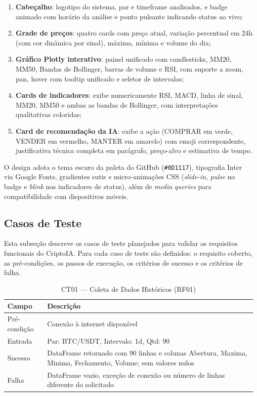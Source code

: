 \documentclass[conference]{IEEEtran}
\begin{document}
\begin{enumerate}
  \item \textbf{Cabeçalho}: logotipo do sistema, par e timeframe analisados, e badge animado com horário da análise e ponto pulsante indicando status ao vivo;
  \item \textbf{Grade de preços}: quatro cards com preço atual, variação percentual em 24h (com cor dinâmica por sinal), máxima, mínima e volume do dia;
  \item \textbf{Gráfico Plotly interativo}: painel unificado com candlesticks, MM20, MM50, Bandas de Bollinger, barras de volume e RSI, com suporte a zoom, pan, hover com tooltip unificado e seletor de intervalos;
  \item \textbf{Cards de indicadores}: exibe numericamente RSI, MACD, linha de sinal, MM20, MM50 e ambas as bandas de Bollinger, com interpretações qualitativas coloridas;
  \item \textbf{Card de recomendação da IA}: exibe a ação (COMPRAR em verde, VENDER em vermelho, MANTER em amarelo) com emoji correspondente, justificativa técnica completa em parágrafo, preço-alvo e estimativa de tempo.
\end{enumerate}

O design adota o tema escuro da paleta do GitHub (\texttt{\#0D1117}), tipografia Inter via Google Fonts, gradientes sutis e micro-animações CSS (\textit{slide-in}, \textit{pulse} no badge e \textit{blink} nos indicadores de status), além de \textit{media queries} para compatibilidade com dispositivos móveis.

\subsection{Casos de Teste}
\label{sec:testes}

Esta subseção descreve os casos de teste planejados para validar os requisitos funcionais do CriptoIA. Para cada caso de teste são definidos: o requisito coberto, as pré-condições, os passos de execução, os critérios de sucesso e os critérios de falha.

\begin{table}[H]
  \centering
  \caption{CT01 — Coleta de Dados Históricos (RF01)}
  \label{tab:ct01}
  \begin{tabular}{p{2.5cm}p{5cm}}
    \toprule
    \textbf{Campo} & \textbf{Descrição} \\
    \midrule
    Pré-condição  & Conexão à internet disponível \\
    Entrada       & Par: BTC/USDT, Intervalo: 1d, Qtd: 90 \\
    Sucesso       & DataFrame retornado com 90 linhas e colunas Abertura, Maxima, Minima, Fechamento, Volume; sem valores nulos \\
    Falha         & DataFrame vazio, exceção de conexão ou número de linhas diferente do solicitado \\
    \bottomrule
  \end{tabular}
\end{table}
\end{document}
